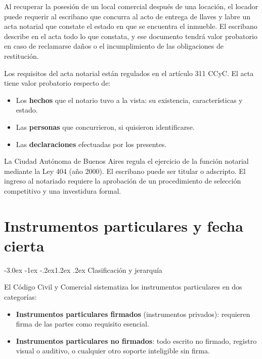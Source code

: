 \documentclass[12pt,oneside]{book}
\makeatletter
\renewcommand\section{\@startsection{section}{1}{\z@}%
  {-3.0ex \@plus -1ex \@minus -.2ex}{1.2ex \@plus .2ex}%
  {\normalfont\large\bfseries\color{acento}}}
\makeatother
\begin{document}
\begin{ejemplo}
Al recuperar la posesión de un local comercial después de una locación, el locador puede requerir al escribano que concurra al acto de entrega de llaves y labre un acta notarial que constate el estado en que se encuentra el inmueble. El escribano describe en el acta todo lo que constata, y ese documento tendrá valor probatorio en caso de reclamarse daños o el incumplimiento de las obligaciones de restitución.
\end{ejemplo}

Los requisitos del acta notarial están regulados en el artículo 311 CCyC. El acta tiene valor probatorio respecto de:

\begin{itemize}
    \item Los \textbf{hechos} que el notario tuvo a la vista: su existencia, características y estado.
    \item Las \textbf{personas} que concurrieron, si quisieron identificarse.
    \item Las \textbf{declaraciones} efectuadas por los presentes.
\end{itemize}

\begin{nota}
La Ciudad Autónoma de Buenos Aires regula el ejercicio de la función notarial mediante la Ley 404 (año 2000). El escribano puede ser titular o adscripto. El ingreso al notariado requiere la aprobación de un procedimiento de selección competitivo y una investidura formal.
\end{nota}


\chapter{Instrumentos particulares y fecha cierta}

\section{Clasificación y jerarquía}

El Código Civil y Comercial sistematiza los instrumentos particulares en dos categorías:

\begin{itemize}
    \item \textbf{Instrumentos particulares firmados} (instrumentos privados): requieren firma de las partes como requisito esencial.
    \item \textbf{Instrumentos particulares no firmados}: todo escrito no firmado, registro visual o auditivo, o cualquier otro soporte inteligible sin firma.
\end{itemize}
\end{document}
